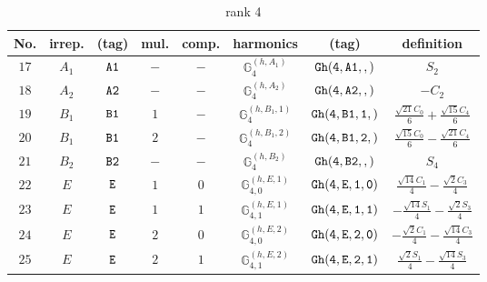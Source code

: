 \documentclass[fleqn,8pt]{jsarticle}
\begin{document}
\begin{table}[ht!]
\begin{center}
\caption{rank 4}
\renewcommand{\arraystretch}{1.3}
\begin{tabular}{cccccccc} \hline \hline
No. & irrep. & (tag) & mul. & comp. & harmonics & (tag) & definition \\ \hline
$ 17 $ & $ A_{1} $ & $ {\tt A1} $ & $ - $ & $ - $ & $ \mathbb{G}_{4}^{(h,A_{1})} $ & $ {\tt Gh(4,A1,,)} $ & $ S_{2} $ \\
$ 18 $ & $ A_{2} $ & $ {\tt A2} $ & $ - $ & $ - $ & $ \mathbb{G}_{4}^{(h,A_{2})} $ & $ {\tt Gh(4,A2,,)} $ & $ - C_{2} $ \\
$ 19 $ & $ B_{1} $ & $ {\tt B1} $ & $ 1 $ & $ - $ & $ \mathbb{G}_{4}^{(h,B_{1},1)} $ & $ {\tt Gh(4,B1,1,)} $ & $ \frac{\sqrt{21} C_{0}}{6} + \frac{\sqrt{15} C_{4}}{6} $ \\
$ 20 $ & $ B_{1} $ & $ {\tt B1} $ & $ 2 $ & $ - $ & $ \mathbb{G}_{4}^{(h,B_{1},2)} $ & $ {\tt Gh(4,B1,2,)} $ & $ \frac{\sqrt{15} C_{0}}{6} - \frac{\sqrt{21} C_{4}}{6} $ \\
$ 21 $ & $ B_{2} $ & $ {\tt B2} $ & $ - $ & $ - $ & $ \mathbb{G}_{4}^{(h,B_{2})} $ & $ {\tt Gh(4,B2,,)} $ & $ S_{4} $ \\
$ 22 $ & $ E $ & $ {\tt E} $ & $ 1 $ & $ 0 $ & $ \mathbb{G}_{4,0}^{(h,E,1)} $ & $ {\tt Gh(4,E,1,0)} $ & $ \frac{\sqrt{14} C_{1}}{4} - \frac{\sqrt{2} C_{3}}{4} $ \\
$ 23 $ & $ E $ & $ {\tt E} $ & $ 1 $ & $ 1 $ & $ \mathbb{G}_{4,1}^{(h,E,1)} $ & $ {\tt Gh(4,E,1,1)} $ & $ - \frac{\sqrt{14} S_{1}}{4} - \frac{\sqrt{2} S_{3}}{4} $ \\
$ 24 $ & $ E $ & $ {\tt E} $ & $ 2 $ & $ 0 $ & $ \mathbb{G}_{4,0}^{(h,E,2)} $ & $ {\tt Gh(4,E,2,0)} $ & $ - \frac{\sqrt{2} C_{1}}{4} - \frac{\sqrt{14} C_{3}}{4} $ \\
$ 25 $ & $ E $ & $ {\tt E} $ & $ 2 $ & $ 1 $ & $ \mathbb{G}_{4,1}^{(h,E,2)} $ & $ {\tt Gh(4,E,2,1)} $ & $ \frac{\sqrt{2} S_{1}}{4} - \frac{\sqrt{14} S_{3}}{4} $ \\
 \hline \hline
\end{tabular}
\end{center}
\end{table}
\end{document}
